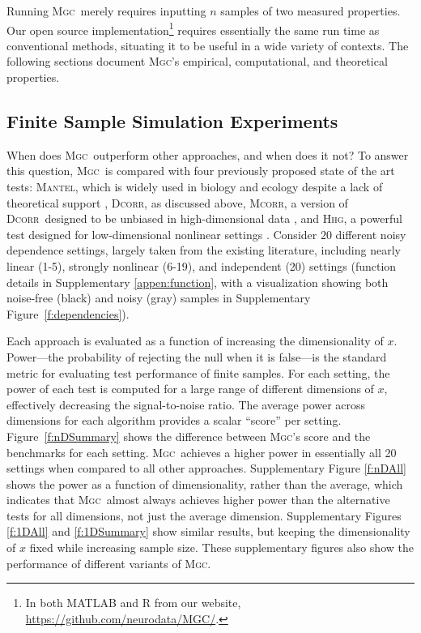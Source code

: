 \documentclass[11pt]{article}
\providecommand{\sct}[1]{{\normalfont\textsc{#1}}}
\newcommand{\Mgc}{\sct{Mgc}}
\newcommand{\Hhg}{\sct{Hhg}}
\newcommand{\Dcorr}{\sct{Dcorr}}
\newcommand{\Mcorr}{\sct{Mcorr}}
\newcommand{\Mantel}{\sct{Mantel}}
\newcommand{\website}{\url{https://github.com/neurodata/MGC/}}
\begin{document}
Running \Mgc~merely requires inputting $n$ samples of two measured properties.  Our open source implementation\footnote{In both MATLAB and R from our website, \website.} requires essentially the same run time as conventional methods, situating it to be useful in a wide variety of contexts. The following sections document \Mgc's empirical, computational, and theoretical properties. 



\subsection*{Finite Sample Simulation Experiments}

When does \Mgc~outperform other approaches, and when does it not?
To answer this question, \Mgc~is compared with four previously proposed state of the art tests: \Mantel, which is widely used in biology and ecology despite a lack of theoretical support \cite{Mantel1967}, \Dcorr, as discussed above, \Mcorr, a version of \Dcorr~designed to be unbiased in high-dimensional data \cite{SzekelyRizzo2013a}, and \Hhg, a powerful test designed for low-dimensional nonlinear settings \cite{HellerGorfine2013}. 
Consider $20$ different noisy dependence settings, largely taken from the existing literature, including  nearly linear (1-5), strongly nonlinear (6-19), and independent (20) settings \cite{SzekelyRizzoBakirov2007, SimonTibshirani2012, GorfineHellerHeller2012, HellerGorfine2013, SzekelyRizzo2013a}  
(function details in Supplementary \ref{appen:function}, with a visualization showing both noise-free (black) and noisy (gray) samples in Supplementary Figure~\ref{f:dependencies}).  


Each approach is evaluated as a function of increasing the dimensionality of $x$.  Power---the probability of rejecting the null when it is  false---is the standard metric for evaluating test performance of finite samples.  For each setting, the power of each test is computed for a large range of different dimensions of $x$,  effectively decreasing the signal-to-noise ratio.  
The average power across dimensions for each algorithm provides a scalar ``score'' per setting.  %
Figure~\ref{f:nDSummary} shows the difference between \Mgc's score and the benchmarks for each setting.  
\Mgc~achieves a higher power in essentially all 20 settings when compared to all other approaches.  
Supplementary Figure \ref{f:nDAll} shows the power as a function of dimensionality, rather than the average, which indicates that  \Mgc~almost always achieves higher power than the alternative tests for all dimensions, not just the average dimension.  
Supplementary Figures \ref{f:1DAll} and \ref{f:1DSummary} show similar results,  but keeping the dimensionality of $x$ fixed while increasing sample size. These supplementary figures also show the performance of different variants of \Mgc.%
\end{document}
